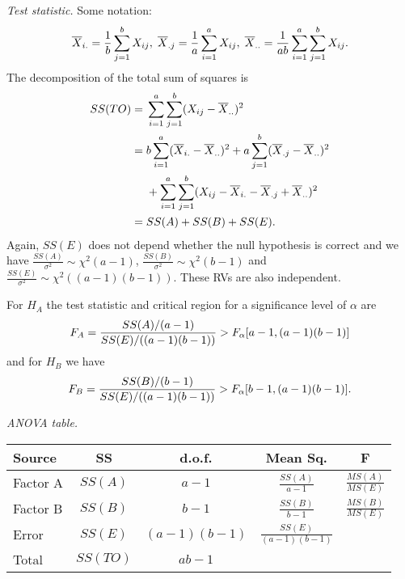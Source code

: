 \documentclass[10pt, two column]{article}
\begin{document}
\emph{Test statistic.} Some notation:  \vspace{-5pt}
\[
\overline{X}_{i.} = \frac{1}{b} \sum_{j=1}^{b} X_{ij}, \; \overline{X}_{.j} = \frac{1}{a} \sum_{i=1}^{a} X_{ij}, \; \overline{X}_{..} = \frac{1}{ab} \sum_{i=1}^{a} \sum_{j=1}^{b} X_{ij}.  \vspace{-5pt}
\]
The decomposition of the total sum of squares is \vspace{-5pt}
\begin{align*}
SS(TO) = \; &\sum_{i=1}^{a} \sum_{j=1}^{b} (X_{ij} - \overline{X}_{..})^{2} \\
= \; &b \sum_{i=1}^{a}(\overline{X}_{i.} - \overline{X}_{..})^{2} + a \sum_{j=1}^{b}(\overline{X}_{.j} - \overline{X}_{..})^{2}\\
&+ \sum_{i=1}^{a} \sum_{j=1}^{b} (X_{ij} - \overline{X}_{i.} - \overline{X}_{.j} + \overline{X}_{..})^{2} \\
= \; &SS(A) + SS(B) + SS(E).  \vspace{-5pt}
\end{align*}
Again, $SS(E)$ does not depend whether the null hypothesis is correct and we have $\frac{SS(A)}{\sigma^{2}} \sim \chi^{2}(a-1)$, $\frac{SS(B)}{\sigma^{2}} \sim \chi^{2}(b-1)$ and $\frac{SS(E)}{\sigma^{2}} \sim \chi^{2}((a-1)(b-1))$. These RVs are also independent. 

For $H_{A}$ the test statistic and critical region for a significance level of $\alpha$ are \vspace{-5pt}
\[
F_{A} = \frac{SS(A)/(a-1)}{SS(E)/((a-1)(b-1))} > F_{\alpha}[a-1, (a-1)(b-1)] \vspace{-5pt}
\]
and for $H_{B}$ we have 
\[
F_{B} = \frac{SS(B)/(b-1)}{SS(E)/((a-1)(b-1))} > F_{\alpha}[b-1, (a-1)(b-1)]. \vspace{-5pt}
\]

\emph{ANOVA table.}

{\small
\begin{tabular}{l | c c c c}
Source & SS & d.o.f. & Mean Sq. & F \\
\hline
Factor A & $SS(A)$ & $a-1$ & $\frac{SS(A)}{a-1}$ & $\frac{MS(A)}{MS(E)}$ \\
Factor B & $SS(B)$ & $b-1$ & $\frac{SS(B)}{b-1}$ & $\frac{MS(B)}{MS(E)}$ \\
Error & $SS(E)$ & $(a-1)(b-1)$ & $\frac{SS(E)}{(a-1)(b-1)}$ \\
Total & $SS(TO)$ & $ab-1$\\  
\hline
\end{tabular}}
\end{document}
